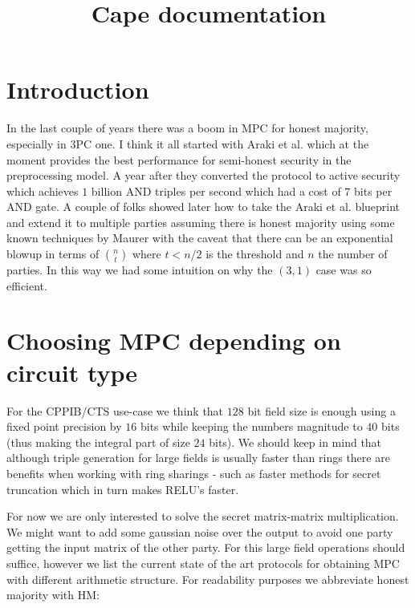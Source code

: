 \documentclass[11pt]{article}
\begin{document}
%

\title{Cape documentation}

\maketitle

\section{Introduction}


In the last couple of years there was a boom in MPC for honest majority,
especially in 3PC one. I think it all started with Araki et al.
\cite{CCS:AFLNO16} which at the moment provides the best performance for
semi-honest security in the preprocessing model. A year after they converted
the protocol to active security which achieves $1$ billion AND triples per
second \cite{SP:ABFLLN17} which had a cost of $7$ bits per AND gate. A couple
of folks showed later how to take the Araki et al. \cite{CCS:AFLNO16}
blueprint and extend it to multiple parties assuming there is honest majority
\cite{SCN:KRSW18} using some known techniques by Maurer \cite{SCN:Maurer02}
with the caveat that there can be an exponential blowup in terms of $n
\choose t$ where $t<n/2$ is the threshold and $n$ the number of parties. In
this way we had some intuition on why the $(3,1)$ case was so efficient.

\section{Choosing MPC depending on circuit type} For the CPPIB/CTS use-case
we think that $128$ bit field size is enough using a fixed point precision by
$16$ bits while keeping the numbers magnitude to $40$ bits (thus making the
integral part of size $24$ bits). We should keep in mind that although triple
generation for large fields is usually faster than rings there are benefits
when working with ring sharings - such as faster methods for secret
truncation which in turn makes RELU's faster.

For now we are only interested to solve the secret matrix-matrix
multiplication. We might want to add some gaussian noise over the output to
avoid one party getting the input matrix of the other party. For this large
field operations should suffice, however we list the current state of the art
protocols for obtaining MPC with different arithmetic structure. For
readability purposes we abbreviate honest majority with HM:
\end{document}

